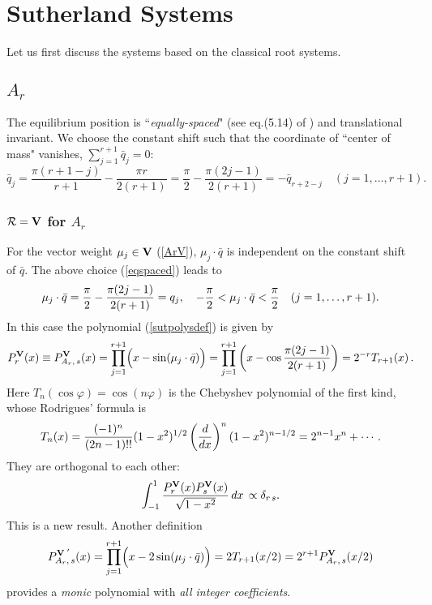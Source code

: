 \documentclass[a4paper,12pt]{article}
\begin{document}
\section{Sutherland Systems}
\label{csutsys}
\setcounter{equation}{0}

Let us first discuss the systems based on the classical root systems.
\subsection{$A_r$}

The equilibrium position is ``{\em equally-spaced\/}" (see eq.(5.14)
of \cite{cs}) and translational invariant.
We choose the constant shift such that the coordinate of ``center of mass"
vanishes, $\displaystyle \sum_{j=1}^{r+1}\bar{q}_j=0$:
\begin{equation}
   \bar{q}_j=\frac{\pi(r+1-j)}{r+1}-\frac{\pi r}{2(r+1)}=
   \frac{\pi}{2}-\frac{\pi(2j-1)}{2(r+1)}=-\bar{q}_{r+2-j}
   \quad(j=1,\ldots,r+1).
   \label{eqspaced}
\end{equation}

\subsubsection{${\cal R}={\bf V}$ for $A_r$}

For the vector weight $\mu_j\in{\bf V}$ (\ref{ArV}), $\mu_j\cdot\bar{q}$ is
independent on the constant shift of $\bar{q}$.
The above choice (\ref{eqspaced}) leads to
\begin{equation}
   \mu_j\cdot\bar{q}={\pi\over2}-{\pi(2j-1)\over{2(r+1)}}=q_j,
   \quad -{\pi\over2}<\mu_j\cdot\bar{q}<{\pi\over2}\quad(j=1,\ldots,r+1).
   \label{Armujq}
\end{equation}
In this case the polynomial (\ref{sutpolysdef}) is given by
\begin{equation}
   P_r^{\bf V}(x)\equiv P_{A_r,\,s}^{\bf V}(x)
   =\prod_{j=1}^{r+1}\Bigl(x-\sin(\mu_j\cdot\bar{q})\Bigr)
   =\prod_{j=1}^{r+1}\left(x-\cos{\pi(2j-1)\over{2(r+1)}}\right)
   =2^{-r}T_{r+1}(x)\,.
   \label{archev}
\end{equation}
Here $T_n(\cos\varphi)=\cos(n\varphi)$ is the Chebyshev polynomial
of the first kind, whose Rodrigues' formula is
\begin{equation}
   T_n(x)=\frac{(-1)^n}{(2n-1)!!}(1-x^2)^{1/2}\left({d\over{dx}}\right)^n
   (1-x^2)^{n-1/2}=2^{n-1}x^n+\cdots.
   \label{cheby}
\end{equation}
They are orthogonal to each other:
\begin{equation}
   \int_{-1}^1{P_r^{\bf V}(x)P_s^{\bf V}(x)\over{\sqrt{1-x^2}}}\,dx\,
   \propto\delta_{r\,s}.
\end{equation}
This is a new result. Another definition
\begin{equation}
   P_{A_r,\,s}^{{\bf V}\;{}^\prime}(x)
   =\prod_{j=1}^{r+1}\Bigl(x-2\sin(\mu_j\cdot\bar{q})\Bigr)=
   2T_{r+1}(x/2)=2^{r+1}P_{A_r,\,s}^{\bf V}(x/2)
\end{equation}
provides a {\em monic} polynomial with {\em all integer coefficients\/}.
\end{document}
